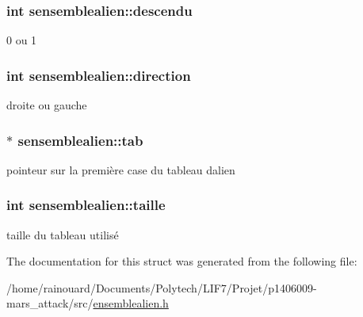 \subsubsection[{\texorpdfstring{descendu}{descendu}}]{\setlength{\rightskip}{0pt plus 5cm}int sensemblealien\+::descendu}\hypertarget{structsensemblealien_a0cd3f028bad69f618f0132ffc886d999}{}\label{structsensemblealien_a0cd3f028bad69f618f0132ffc886d999}
0 ou 1 
\subsubsection[{\texorpdfstring{direction}{direction}}]{\setlength{\rightskip}{0pt plus 5cm}int sensemblealien\+::direction}\hypertarget{structsensemblealien_a3ce4e10c50aa4bf11011e269f3191dbd}{}\label{structsensemblealien_a3ce4e10c50aa4bf11011e269f3191dbd}
droite ou gauche 
\subsubsection[{\texorpdfstring{tab}{tab}}]{$\ast$ sensemblealien\+::tab}\hypertarget{structsensemblealien_ab993168369d8bba89e77c0f00a75556a}{}\label{structsensemblealien_ab993168369d8bba89e77c0f00a75556a}
pointeur sur la première case du tableau d\textquotesingle{}alien 
\subsubsection[{\texorpdfstring{taille}{taille}}]{\setlength{\rightskip}{0pt plus 5cm}int sensemblealien\+::taille}\hypertarget{structsensemblealien_abd74f9d69ddfbe5faa466ce3e2108513}{}\label{structsensemblealien_abd74f9d69ddfbe5faa466ce3e2108513}
taille du tableau utilisé 

The documentation for this struct was generated from the following file\+:\begin{DoxyCompactItemize}
\item 
/home/rainouard/\+Documents/\+Polytech/\+L\+I\+F7/\+Projet/p1406009-\/mars\+\_\+attack/src/\hyperlink{ensemblealien_8h}{ensemblealien.\+h}\end{DoxyCompactItemize}
